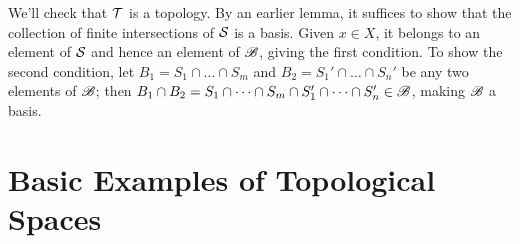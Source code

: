\documentclass[10pt]{report}
\begin{document}
  We'll check that $\mathcal{T}$ is a topology.
  By an earlier lemma, it suffices to show that the collection of finite intersections of $\mathcal{S}$ is a basis.
  Given $x \in X$, it belongs to an element of $\mathcal{S}$ and hence an element of $\mathscr{B}$, giving the first condition.
  To show the second condition, let $B_1 = S_1 \cap \dots \cap S_m$ and $B_2 = S_1' \cap \dots \cap S_n'$ be any two elements of $\mathscr{B}$; then $B_1 \cap B_2 = S_1 \cap \dots \cap S_m \cap S_1' \cap \dots \cap S_n' \in \mathscr{B}$, making $\mathscr{B}$ a basis.

  \section{Basic Examples of Topological Spaces}
\end{document}
